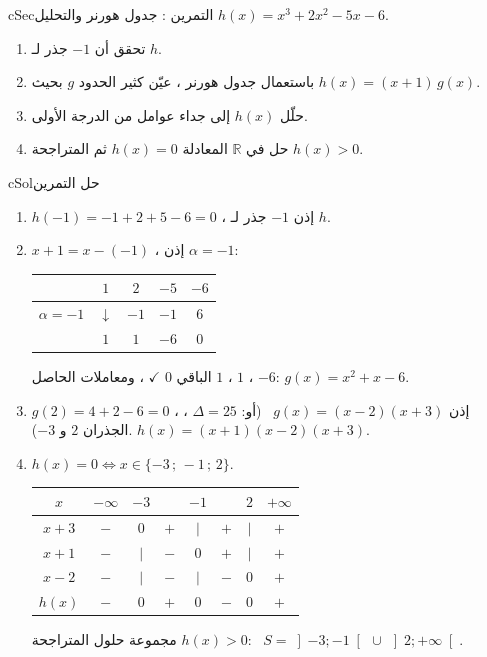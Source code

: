 \documentclass[12pt,a4paper]{article}
\newenvironment{BOX}[2]{\begin{otherlanguage}{english}\begin{arbox}{#1}{#2}}{\end{arbox}\end{otherlanguage}}
\newcounter{exo}
\newenvironment{tamrin}[1]{\stepcounter{exo}\begin{BOX}{cSec}{التمرين \theexo: #1}}{\end{BOX}}
\newenvironment{hal}{\Needspace{12\baselineskip}\begin{otherlanguage}{english}\begin{arbox}[breakable]{cSol}{حل التمرين \theexo}}{\end{arbox}\end{otherlanguage}}
\newenvironment{LTR}{\begin{otherlanguage}{english}}{\end{otherlanguage}}
\newcommand{\R}{\mathbb{R}}
\begin{document}
\begin{tamrin}{جدول هورنر والتحليل}
$h(x)=x^3+2x^2-5x-6$.
\begin{enumerate}
\item تحقق أن $-1$ جذر لـ $h$.
\item باستعمال جدول هورنر ، عيّن كثير الحدود $g$ بحيث $h(x)=(x+1)\,g(x)$.
\item حلّل $h(x)$ إلى جداء عوامل من الدرجة الأولى.
\item حل في $\R$ المعادلة $h(x)=0$ ثم المتراجحة $h(x)>0$.
\end{enumerate}
\end{tamrin}
\begin{hal}
\begin{enumerate}
\item $h(-1)=-1+2+5-6=0$ ، إذن $-1$ جذر لـ $h$.
\item $x+1=x-(-1)$ ، إذن $\alpha=-1$:
\begin{center}
\begin{LTR}
\renewcommand{\arraystretch}{1.5}
\begin{tabular}{|c|c|c|c|c|}\hline
\cellcolor{cDef!15} & \cellcolor{cDef!15}$1$ & \cellcolor{cDef!15}$2$ & \cellcolor{cDef!15}$-5$ & \cellcolor{cDef!15}$-6$\\\hline
\cellcolor{cEx!25}$\alpha=-1$ & $\downarrow$ & $-1$ & $-1$ & $6$\\\hline
 & \cellcolor{cSol!15}$1$ & \cellcolor{cSol!15}$1$ & \cellcolor{cSol!15}$-6$ & \cellcolor{cThm!20}$0$\\\hline
\end{tabular}
\end{LTR}
\end{center}
الباقي $0$ $\checkmark$ ، ومعاملات الحاصل $1$ ، $1$ ، $-6$: \quad $\boxed{g(x)=x^2+x-6}$.
\item $g(2)=4+2-6=0$ ، إذن $g(x)=(x-2)(x+3)$ \ (أو: $\Delta=25$ ، الجذران $2$ و $-3$). \quad $\boxed{h(x)=(x+1)(x-2)(x+3)}$.
\item $h(x)=0\iff x\in\{-3\,;\,-1\,;\,2\}$.
\begin{center}
\renewcommand{\arraystretch}{1.4}
\begin{tabular}{|C|C|C|C|C|C|C|C|}\hline
{}$x$ & $-\infty$ \quad & $-3$ & & $-1$ & & $2$ & \quad $+\infty$\\\hline
$x+3$ & $-$ & $0$ & $+$ & $\vert$ & $+$ & $\vert$ & $+$\\\hline
$x+1$ & $-$ & $\vert$ & $-$ & $0$ & $+$ & $\vert$ & $+$\\\hline
$x-2$ & $-$ & $\vert$ & $-$ & $\vert$ & $-$ & $0$ & $+$\\\hline
$h(x)$ & $-$ & $0$ & $+$ & $0$ & $-$ & $0$ & $+$\\\hline
\end{tabular}
\end{center}
مجموعة حلول المتراجحة $h(x)>0$: \ $\boxed{S=\left]-3;-1\right[\,\cup\,\left]2;+\infty\right[}$.
\end{enumerate}
\end{hal}
\end{document}
